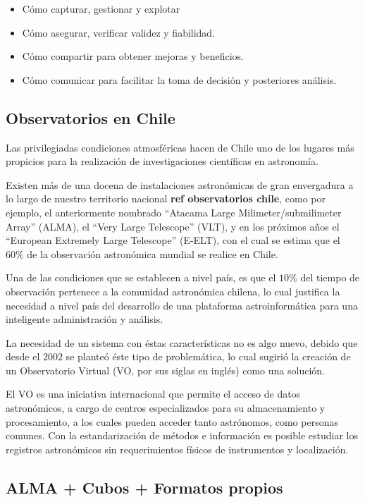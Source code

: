\begin{itemize}
    \item Cómo capturar, gestionar y explotar
    \item Cómo asegurar, verificar validez y fiabilidad.
    \item Cómo compartir para obtener mejoras y beneficios.
    \item Cómo comunicar para facilitar la toma de decisión y posteriores análisis.
\end{itemize}

\subsection{Observatorios en Chile}

Las privilegiadas condiciones atmosféricas hacen de Chile uno de los lugares
más propicios para la realización de investigaciones científicas en astronomía.

Existen más de una docena de instalaciones astronómicas de gran envergadura a
lo largo de nuestro territorio nacional {\bf ref observatorios chile}, como por
ejemplo, el anteriormente nombrado ``Atacama Large Milimeter/submilimeter
Array'' (ALMA), el ``Very Large Telescope'' (VLT), y en los próximos años el
``European Extremely Large Telescope'' (E-ELT), con el cual se estima que el
$60\%$ de la observación astronómica mundial se realice en Chile.

Una de las condiciones que se establecen a nivel país, es que el $10\%$ del
tiempo de observación pertenece a la comunidad astronómica chilena, lo cual
justifica la necesidad a nivel país del desarrollo de una plataforma
astroinformática para una inteligente administración y análisis.

La necesidad de un sistema con éstas características no es algo nuevo, debido
que desde el $2002$ se planteó éste tipo de problemática, lo cual sugirió la
creación de un Observatorio Virtual (VO, por sus siglas en inglés) como una
solución.

El VO es una iniciativa internacional que permite el acceso de datos
astronómicos, a cargo de centros especializados para su almacenamiento y
procesamiento, a los cuales pueden acceder tanto astrónomos, como personas
comunes.  Con la estandarización de métodos e información es posible estudiar
los registros astronómicos sin requerimientos físicos de instrumentos y
localización.

\subsection{ALMA + Cubos + Formatos propios}

